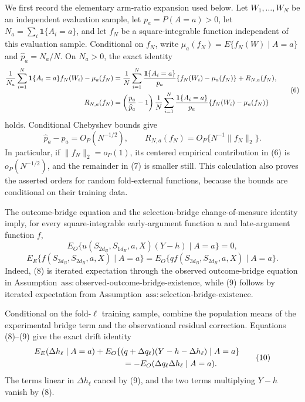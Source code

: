 We first record the elementary arm-ratio expansion used below.  Let \(W_1,\ldots,W_N\) be an independent evaluation sample, let \(p_a=P(A=a)>0\), let \(N_a=\sum_i\mathbf1\{A_i=a\}\), and let \(f_N\) be a square-integrable function independent of this evaluation sample.  Conditional on \(f_N\), write \(\mu_a(f_N)=E\{f_N(W)\mid A=a\}\) and \(\widehat p_a=N_a/N\).  On \(N_a>0\), the exact identity
\[
\begin{aligned}
 \frac1{N_a}\sum_{i=1}^N\mathbf1\{A_i=a\}f_N(W_i)-\mu_a(f_N)
 &={1\over N}\sum_{i=1}^N{\mathbf1\{A_i=a\}\over p_a}
 \{f_N(W_i)-\mu_a(f_N)\}+R_{N,a}(f_N),\\
 R_{N,a}(f_N)
 &=\left({p_a\over\widehat p_a}-1\right)
 {1\over N}\sum_{i=1}^N{\mathbf1\{A_i=a\}\over p_a}
 \{f_N(W_i)-\mu_a(f_N)\}
\end{aligned} \tag{6}
\]
holds.  Conditional Chebyshev bounds give
\[
 \widehat p_a-p_a=O_P(N^{-1/2}),
 \qquad
 R_{N,a}(f_N)=O_P\{N^{-1}\|f_N\|_2\}. \tag{7}
\]
In particular, if \(\|f_N\|_2=o_P(1)\), its centered empirical contribution in (6) is \(o_P(N^{-1/2})\), and the remainder in (7) is smaller still.  This calculation also proves the asserted orders for random fold-external functions, because the bounds are conditional on their training data.

The outcome-bridge equation and the selection-bridge change-of-measure identity imply, for every square-integrable early-argument function \(u\) and late-argument function \(f\),
\[
 E_O\{u(S_{2d_B},S_{1d_B},a,X)(Y-h)\mid A=a\}=0, \tag{8}
\]
\[
 E_E\{f(S_{3d_B},S_{2d_B},a,X)\mid A=a\}
 =E_O\{qf(S_{3d_B},S_{2d_B},a,X)\mid A=a\}. \tag{9}
\]
Indeed, (8) is iterated expectation through the observed outcome-bridge equation in Assumption~\(\mathrm{ass{:}observed\text{-}outcome\text{-}bridge\text{-}existence}\), while (9) follows by iterated expectation from Assumption~\(\mathrm{ass{:}selection\text{-}bridge\text{-}existence}\).

Conditional on the fold-\(\ell\) training sample, combine the population means of the experimental bridge term and the observational residual correction.  Equations (8)--(9) give the exact drift identity
\[
\begin{aligned}
 &E_E(\Delta h_\ell\mid A=a)
 +E_O\{(q+\Delta q_\ell)(Y-h-\Delta h_\ell)\mid A=a\}\\
 &\hspace{38mm}=-E_O(\Delta q_\ell\Delta h_\ell\mid A=a). 
\end{aligned} \tag{10}
\]
The terms linear in \(\Delta h_\ell\) cancel by (9), and the two terms multiplying \(Y-h\) vanish by (8).

